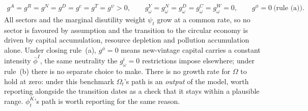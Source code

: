 \begin{align}
g^A=g^R=g^N=g^D=g^c=g^T=g^\psi>0,
\qquad
g^Y_\omega=g^N_\omega=g^D_\omega=g^C_\omega=g^W_\omega=0,
\qquad
g^\phi=0\ \text{(rule~(a))}.
\label{eq:aq:benchmark}
\end{align}
All sectors and the marginal disutility weight $\psi_t$ grow at a common rate, so no sector is favoured by assumption and the transition to the circular economy is driven by capital accumulation, resource depletion and pollution accumulation alone. Under closing rule~(a), $g^\phi=0$ means new-vintage capital carries a constant intensity $\bar\phi^I$, the same neutrality the $g^i_\omega=0$ restrictions impose elsewhere; under rule~(b) there is no separate choice to make. There is no growth rate for $\Omega$ to hold at zero: under this benchmark $\Omega_t$'s path is an \emph{output} of the model, worth reporting alongside the transition dates as a check that it stays within a plausible range. $\phi^K_t$'s path is worth reporting for the same reason.

